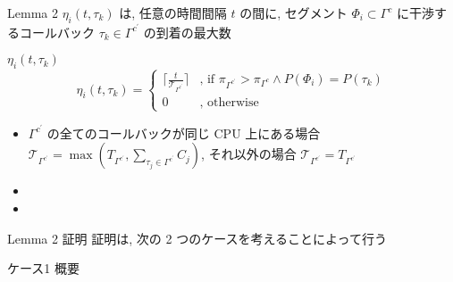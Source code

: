 \begin{frame}{Lemma 2}
    \vspace{-1mm}
    $\eta_{i}\left(t, \tau_{k}\right)$ は, 任意の時間間隔 $t$ の間に, セグメント $\Phi_{i} \subset \Gamma^{c}$ に干渉するコールバック $\tau_{k} \in \Gamma^{c^{\prime}}$ の到着の最大数
    \vspace{-1mm}
    \begin{block}{$\eta_{i}\left(t, \tau_{k}\right)$}
        \vspace{-2mm}
        \begin{equation*}
            \eta_{i}\left(t, \tau_{k}\right)= \begin{cases}{\lceil\frac{t}{\mathcal{T}_{\Gamma^{c^{\prime}}}}\rceil} & \text {, if } \pi_{\Gamma^{c^{\prime}}}>\pi_{\Gamma^{c}} \wedge P\left(\Phi_{i}\right)=P\left(\tau_{k}\right) \\ 0 &, \text { otherwise }\end{cases}
        \end{equation*}
        \vspace{-2mm}
        \setlength{\linewidth}{0.98\columnwidth}
        \begin{itemize}
            \item $\Gamma^{c^{\prime}}$ の全てのコールバックが同じ CPU 上にある場合 $\mathcal{T}_{\Gamma^{c^{\prime}}}=\max \left(T_{\Gamma^{c^{\prime}}}, \sum_{\tau_{j} \in \Gamma^{c^{\prime}}} C_{j}\right)$, それ以外の場合 $\mathcal{T}_{\Gamma^{c^{\prime}}}=T_{\Gamma^{c^{\prime}}}$
            \item {}
            \item {}
        \end{itemize}
    \end{block}
\end{frame}

\begin{frame}{Lemma 2 証明}
    証明は, 次の 2 つのケースを考えることによって行う
\end{frame}

\begin{frame}{ケース1 概要}
\end{frame}

